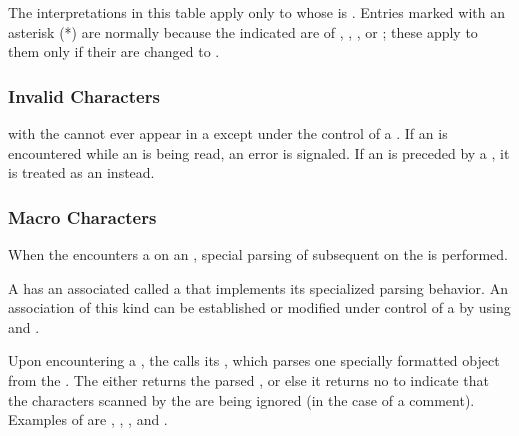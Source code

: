 The interpretations in this table apply only to 
whose  is .
Entries marked with an asterisk (*) are normally  
because the indicated  are of 
,
,
,
or ;
these  apply to them only if their  
are changed to .

\subsubsection{Invalid Characters}

 with the   
cannot ever appear in a  
except under the control of a  .
If an   is encountered while an  is
being read, an error  is signaled.
If an   is preceded by a  ,
it is treated as an   instead.

\subsubsection{Macro Characters}

When the  encounters a  
on an  ,
special parsing of subsequent  
on the   
is performed.

A  has an associated 
called a  that implements its specialized parsing behavior.
An association of this kind can be established or modified under control of
a  by using 
 and .

Upon encountering a , the  calls its
, which parses one specially formatted object 
from the  .
The  either returns the parsed ,
or else it returns no  
    to indicate that the characters scanned by the 
    are being ignored (\eg in the case of a comment).
Examples of 
are , , , and 
.

